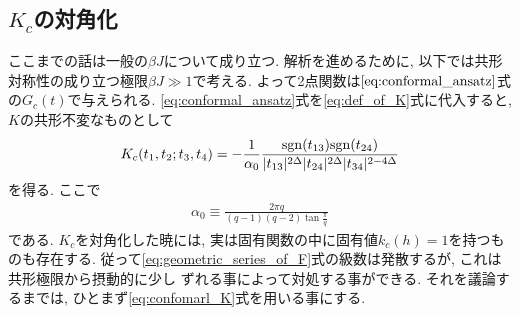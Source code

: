 \subsection{$K_c$の対角化}
ここまでの話は一般の$\beta J$について成り立つ. 
解析を進めるために, 以下では共形対称性の成り立つ極限$\beta J \gg 1$で考える. 
よって2点関数は$\eqref{eq:conformal_ansatz}$式の$G_c(t)$で与えられる. 
\eqref{eq:conformal_ansatz}式を\eqref{eq:def_of_K}式に代入すると, 
$K$の共形不変なものとして
\begin{align}
	K_c(t_1, t_2; t_3, t_4)
	= -\frac{1}{\alpha_0}
		\frac{\mathrm{sgn}(t_{13})\mathrm{sgn}(t_{24})}{|t_{13}|^{2\Delta}|t_{24}|^{2\Delta}|t_{34}|^{2-4\Delta}}
	\label{eq:confomarl_K}
\end{align}
を得る. ここで
\begin{align}
	\alpha_0 \equiv \frac{2\pi q}{(q-1)(q-2)\tan\frac{\pi}{q}}
	\label{eq:alpha_0}
\end{align}
である. 
$K_c$を対角化した暁には, 実は固有関数の中に固有値$k_c(h) = 1$を持つものも存在する. 
従って\eqref{eq:geometric_series_of_F}式の級数は発散するが, これは共形極限から摂動的に少し
ずれる事によって対処する事ができる. 
それを議論するまでは, ひとまず\eqref{eq:confomarl_K}式を用いる事にする. 

